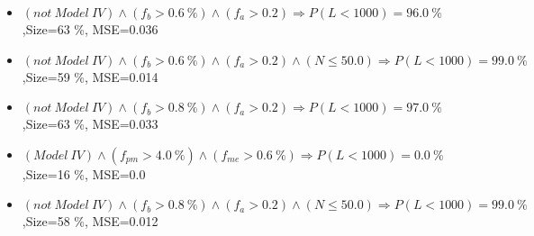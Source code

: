 \documentclass[numbered]{CSL}
\begin{document}
\begin{itemize}
\item $(not~Model~IV) \land (f_b > 0.6~\%) \land (f_a > 0.2) \Rightarrow P(L < 1 000) = 96.0~\%$,\hfill Size=63 \%, MSE=0.036
\item $(not~Model~IV) \land (f_b > 0.6~\%) \land (f_a > 0.2) \land (N \leq 50.0) \Rightarrow P(L < 1 000) = 99.0~\%$,\hfill Size=59 \%, MSE=0.014
\item $(not~Model~IV) \land (f_b > 0.8~\%) \land (f_a > 0.2) \Rightarrow P(L < 1 000) = 97.0~\%$,\hfill Size=63 \%, MSE=0.033
\item $(Model~IV) \land (f_{pm} > 4.0~\%) \land (f_{me} > 0.6~\%) \Rightarrow P(L < 1 000) = 0.0~\%$,\hfill Size=16 \%, MSE=0.0
\item $(not~Model~IV) \land (f_b > 0.8~\%) \land (f_a > 0.2) \land (N \leq 50.0) \Rightarrow P(L < 1 000) = 99.0~\%$,\hfill Size=58 \%, MSE=0.012
\end{itemize}
\end{document}
